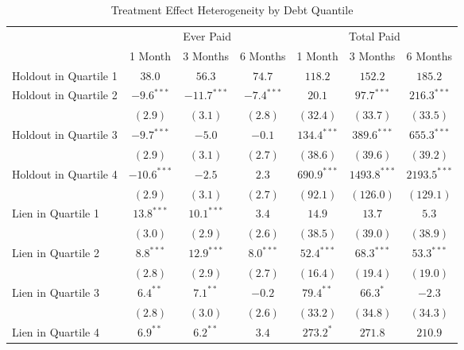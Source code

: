 \begin{table}[htb]
\caption{Treatment Effect Heterogeneity by Debt Quantile}
\begin{center}
\begin{tabular}{l c c c c c c }
\hline
 & \multicolumn{3}{c}{Ever Paid} & \multicolumn{3}{c}{Total Paid} \\
 & 1 Month & 3 Months & 6 Months & 1 Month & 3 Months & 6 Months \\
\hline
Holdout in Quartile 1 & $38.0$  & $56.3$  & $74.7$ & $118.2$ & $152.2$  & $185.2$  \\
\hline
Holdout in Quartile 2 & $-9.6^{***}$  & $-11.7^{***}$ & $-7.4^{***}$ & $20.1$        & $97.7^{***}$   & $216.3^{***}$  \\
                      & $(2.9)$       & $(3.1)$       & $(2.8)$      & $(32.4)$      & $(33.7)$       & $(33.5)$       \\
Holdout in Quartile 3 & $-9.7^{***}$  & $-5.0$        & $-0.1$       & $134.4^{***}$ & $389.6^{***}$  & $655.3^{***}$  \\
                      & $(2.9)$       & $(3.1)$       & $(2.7)$      & $(38.6)$      & $(39.6)$       & $(39.2)$       \\
Holdout in Quartile 4 & $-10.6^{***}$ & $-2.5$        & $2.3$        & $690.9^{***}$ & $1493.8^{***}$ & $2193.5^{***}$ \\
                      & $(2.9)$       & $(3.1)$       & $(2.7)$      & $(92.1)$      & $(126.0)$      & $(129.1)$      \\
Lien in Quartile 1    & $13.8^{***}$  & $10.1^{***}$  & $3.4$        & $14.9$        & $13.7$         & $5.3$          \\
                      & $(3.0)$       & $(2.9)$       & $(2.6)$      & $(38.5)$      & $(39.0)$       & $(38.9)$       \\
Lien in Quartile 2    & $8.8^{***}$   & $12.9^{***}$  & $8.0^{***}$  & $52.4^{***}$  & $68.3^{***}$   & $53.3^{***}$   \\
                      & $(2.8)$       & $(2.9)$       & $(2.7)$      & $(16.4)$      & $(19.4)$       & $(19.0)$       \\
Lien in Quartile 3    & $6.4^{**}$    & $7.1^{**}$    & $-0.2$       & $79.4^{**}$   & $66.3^{*}$     & $-2.3$         \\
                      & $(2.8)$       & $(3.0)$       & $(2.6)$      & $(33.2)$      & $(34.8)$       & $(34.3)$       \\
Lien in Quartile 4    & $6.9^{**}$    & $6.2^{**}$    & $3.4$        & $273.2^{*}$   & $271.8$        & $210.9$        \\

\end{tabular}
\end{center}
\end{table}
